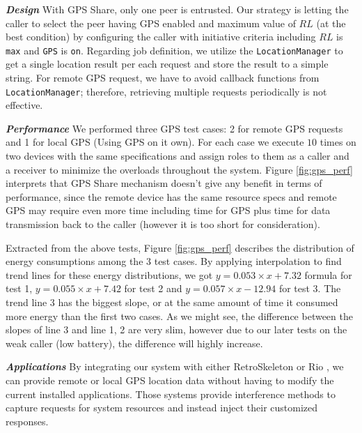 \documentclass{sig-alternate}
\begin{document}
\textbf{\emph{Design}}
With GPS Share, only one peer is entrusted. Our strategy is letting the caller to select the peer having GPS enabled and maximum value of $RL$ (at the best condition) by configuring the caller with initiative criteria including $RL$ is \texttt{max} and \texttt{GPS} is \texttt{on}. Regarding job definition, we utilize the \texttt{LocationManager} to get a single location result per each request and store the result to a simple string. For remote GPS request, we have to avoid callback functions from \texttt{LocationManager}; therefore, retrieving multiple requests periodically is not effective.


\textbf{\emph{Performance}}
We performed three GPS test cases: 2 for remote GPS requests and 1 for local GPS (Using GPS on it own). For each case we execute $10$ times on two devices with the same specifications and assign roles to them as a caller and a receiver to minimize the overloads throughout the system. Figure \ref{fig:gps_perf} interprets that GPS Share mechanism doesn't give any benefit in terms of performance, since the remote device has the same resource specs and remote GPS may require even more time including time for GPS plus time for data transmission back to the caller (however it is too short for consideration).

Extracted from the above tests, Figure \ref{fig:gps_perf} describes the distribution of energy consumptions among the 3 test cases. By applying interpolation to find trend lines for these energy distributions, we got $y = 0.053 \times x + 7.32$ formula for test 1, $y = 0.055 \times x + 7.42$ for test 2 and $y = 0.057 \times x - 12.94$ for test 3. The trend line 3 has the biggest slope, or at the same amount of time it consumed more energy than the first two cases. As we might see, the difference between the slopes of line 3 and line 1, 2 are very slim, however due to our later tests on the weak caller (low battery), the difference will highly increase. 

\textbf{\emph{Applications}}
By integrating our system with either RetroSkeleton \cite{retro-skel} or Rio \cite{rio}, we can provide remote or local GPS location data without having to modify the current installed applications. Those systems provide interference methods to capture requests for system resources and instead inject their customized responses. 
\end{document}
